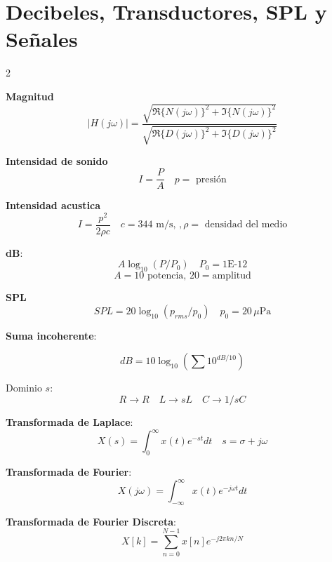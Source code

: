 \documentclass{article}
\begin{document}
\newpage
\section{Decibeles, Transductores, SPL y Señales}
\begin{multicols}{2}

\textbf{Magnitud} 
    $$
\left|H(j\omega)\right|=
\frac{\sqrt{\Re\{N(j\omega)\}^2+\Im\{N(j\omega)\}^2}}
{\sqrt{\Re\{D(j\omega)\}^2+\Im\{D(j\omega)\}^2}} 
$$
\begin{itemform}
\item \textbf{Intensidad de sonido}
$$
I = \dfrac{P}{A} \quad  p = \text{ presión} 
$$
\item \textbf{Intensidad acustica}
$$
I = \dfrac{p^2}{2\rho c} \quad c = 344 \text{ m/s, }, \rho = \text{ densidad del medio} 
$$
  \item \textbf{dB}: 
$$A\log_{10}(P/P_0) \quad P_0 = 1\text{E-12}$$ 
$$A = 10 \text{ potencia, } 20 = \text{amplitud}$$

\item \textbf{SPL} 
$$SPL = 20\log_{10}(p_{rms}/p_0) \quad p_0 = 20\,\mu\text{Pa}$$

\item \textbf{Suma incoherente}: 

$$dB = 10\log_{10}\left(\sum 10^{dB/10}\right)$$



\end{itemform}


\begin{itemform}
\item Dominio $s$: 
$$R\rightarrow R \quad L\rightarrow sL \quad C\rightarrow 1/sC$$

\end{itemform}



\begin{itemform}
  \item \textbf{Transformada de Laplace}:
  $$X(s) = \int_0^\infty x(t)e^{-st}dt \quad s = \sigma + j\omega$$
  \item \textbf{Transformada de Fourier}:
  $$X(j\omega) = \int_{-\infty}^{\infty} x(t)e^{-j\omega t}dt$$
  \item \textbf{Transformada de Fourier Discreta}:
  $$X[k] = \sum_{n=0}^{N-1} x[n]e^{-j2\pi kn/N}$$
\end{itemform}


\end{multicols}
\end{document}
